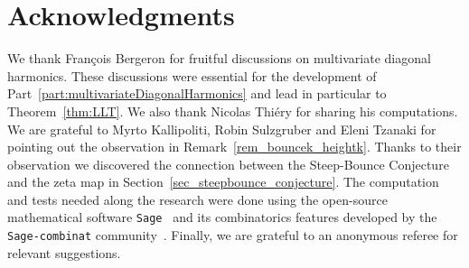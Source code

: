 \documentclass{amsart}
\theoremstyle{definition}
\begin{document}

\section*{Acknowledgments}

We thank Fran\c{c}ois Bergeron for fruitful discussions on multivariate diagonal harmonics.
These discussions were essential for the development of Part~\ref{part:multivariateDiagonalHarmonics} and lead in particular to Theorem~\ref{thm:LLT}.
We also thank Nicolas Thi\'ery for sharing his computations.
We are grateful to Myrto Kallipoliti, Robin Sulzgruber and Eleni Tzanaki for pointing out the observation in Remark~\ref{rem_bouncek_heightk}. 
Thanks to their observation we discovered the connection between the Steep-Bounce Conjecture and the zeta map in Section~\ref{sec_steepbounce_conjecture}.
The computation and tests needed along the research were done using the open-source mathematical software \texttt{Sage}~\cite{Sage} and its combinatorics features developed by the \texttt{Sage-combinat} community~\cite{SageCombinat}.
Finally, we are grateful to an anonymous referee for relevant suggestions.




\label{sec:biblio}

\end{document}

